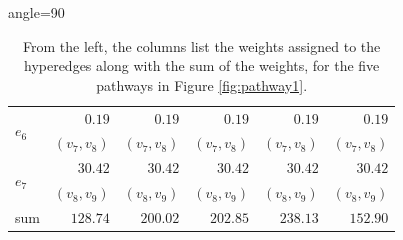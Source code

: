 \begin{table}[!h]
\begin{footnotesize}
\begin{adjustbox}{angle=90}
\begin{tabular}{lrrrrr}
        \multirow{2}{*}{$e_6$} & $0.19$ & \cellcolor{mygray}$0.19$ & \cellcolor{mygray}$0.19$ & \cellcolor{mygray}$0.19$ & \cellcolor{mygray}$0.19$ \\
        & $(v_7, v_8)$ & \cellcolor{mygray}$(v_7, v_8)$ & \cellcolor{mygray}$(v_7, v_8)$ & \cellcolor{mygray}$(v_7, v_8)$ & \cellcolor{mygray}$(v_7, v_8)$\\
        \multirow{2}{*}{$e_7$} & $30.42$ & \cellcolor{mygray}$30.42$ & \cellcolor{mygray}$30.42$ & \cellcolor{mygray}$30.42$ & \cellcolor{mygray}$30.42$ \\
        & $(v_8, v_9)$ & \cellcolor{mygray}$(v_8, v_9)$ & \cellcolor{mygray}$(v_8, v_9)$ & \cellcolor{mygray}$(v_8, v_9)$ & \cellcolor{mygray}$(v_8, v_9)$\\
        \midrule
        sum & $128.74$ & $200.02$ & $202.85$ & $238.13$ & $152.90$ \\
        \bottomrule
    \end{tabular}
    \end{adjustbox}
    \end{footnotesize}
    \vspace{1cm}
    \caption{From the left, the columns list the weights assigned to the hyperedges along with the sum of the weights, for the five pathways in Figure \ref{fig:pathway1}.}
    \label{tab:pathways1}
\end{table}

